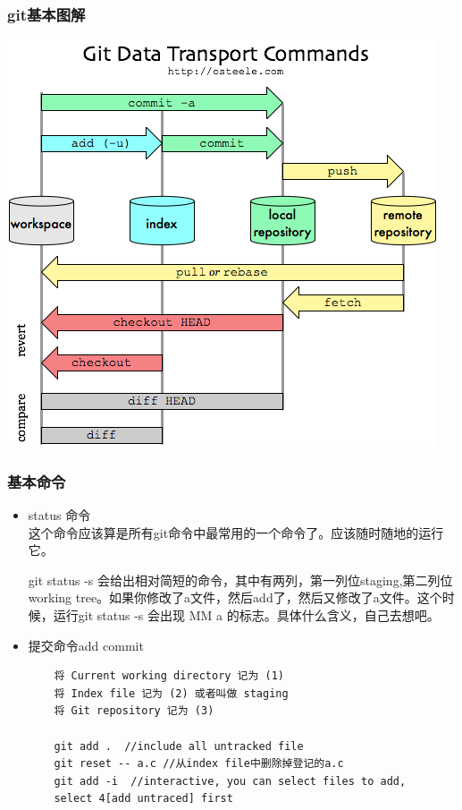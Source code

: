 \documentclass[a4paper,12pt,twoside]{book}
\begin{document}
\begin{CJK*}{UTF8}{song}
\subsubsection{git基本图解}
 \includegraphics[scale=0.8]{pics/git-transport} \\

\subsubsection{基本命令}
\begin{itemize}
\item status 命令 \\
    这个命令应该算是所有git命令中最常用的一个命令了。应该随时随地的运行它。\par
    git status -s 会给出相对简短的命令，其中有两列，第一列位staging,第二列位working tree。如果你修改了a文件，然后add了，然后又修改了a文件。这个时候，运行git status -s
    会出现 MM a 的标志。具体什么含义，自己去想吧。

\item 提交命令add commit
    \begin{verbatim}
    将 Current working directory 记为 (1)
    将 Index file 记为 (2) 或者叫做 staging
    将 Git repository 记为 (3)

    git add .  //include all untracked file
    git reset -- a.c //从index file中删除掉登记的a.c
    git add -i  //interactive, you can select files to add,
    select 4[add untraced] first


\end{verbatim}
\end{itemize}
\end{CJK*}
\end{document}
